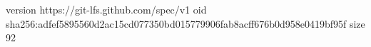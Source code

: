 version https://git-lfs.github.com/spec/v1
oid sha256:adfef5895560d2ac15cd077350bd015779906fab8acff676b0d958e0419bf95f
size 92
